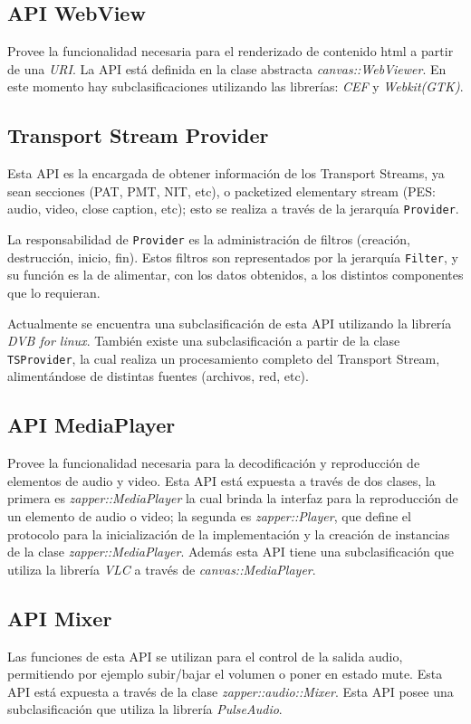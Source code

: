\subsection{API WebView}
Provee la funcionalidad necesaria para el renderizado de contenido html a partir de una \textit{URI}. La API está definida en la clase abstracta \textit{canvas::WebViewer}. En este momento hay subclasificaciones utilizando las librerías: \textit{CEF} y \textit{Webkit(GTK)}.

\subsection{Transport Stream Provider}
Esta API es la encargada de obtener información de los Transport Streams, ya sean secciones (PAT, PMT, NIT, etc), o packetized elementary stream (PES: audio, video, close caption, etc); esto se realiza a través de la jerarquía \texttt{Provider}.

La responsabilidad de \texttt{Provider} es la administración de filtros (creación, destrucción, inicio, fin). Estos filtros son representados por la jerarquía \texttt{Filter}, y su función es la de alimentar, con los datos obtenidos, a los distintos componentes que lo requieran. 

Actualmente se encuentra una subclasificación de esta API utilizando la librería \textit{DVB for linux}. También existe una subclasificación a partir de la clase \texttt{TSProvider}, la cual realiza un procesamiento completo del Transport Stream, alimentándose de distintas fuentes (archivos, red, etc).

\subsection{API MediaPlayer}
Provee la funcionalidad necesaria para la decodificación y reproducción de elementos de audio y video. Esta API está expuesta a través de dos clases, la primera es \textit{zapper::MediaPlayer} la cual brinda la interfaz para la reproducción de un elemento de audio o video; la segunda es \textit{zapper::Player}, que define el protocolo para la inicialización de la implementación y la creación de instancias de la clase \textit{zapper::MediaPlayer}.
Además esta API tiene una subclasificación que utiliza la librería \textit{VLC} a través de \textit{canvas::MediaPlayer}.

\subsection{API Mixer}
Las funciones de esta API se utilizan para el control de la salida audio, permitiendo por ejemplo subir/bajar el volumen o poner en estado mute. Esta API está expuesta a través de la clase \textit{zapper::audio::Mixer}.
Esta API posee una subclasificación que utiliza la librería \textit{PulseAudio}.

